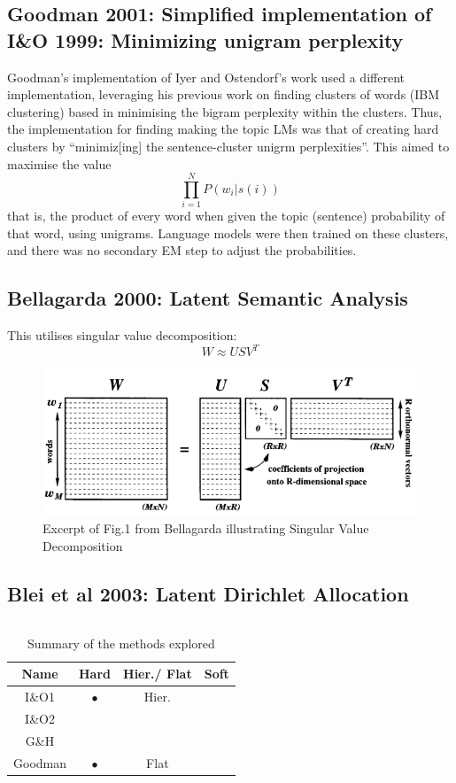 \documentclass{article}
\begin{document}
\subsection{Goodman 2001: Simplified implementation of I\&O 1999: Minimizing unigram perplexity} \label{sec:goodman}
Goodman's implementation of Iyer and Ostendorf's work used a different implementation, leveraging his previous work on finding clusters of words (IBM clustering) based in minimising the bigram perplexity within the clusters. Thus, the implementation for finding making the topic LMs was that of creating hard clusters by ``minimiz[ing] the sentence-cluster unigrm perplexities''. This aimed to maximise the value
$$\prod_{i=1}^{N}P(w_i|s(i))$$
that is, the product of every word when given the topic (sentence) probability of that word, using unigrams. Language models were then trained on these clusters, and there was no secondary EM step to adjust the probabilities.

\FloatBarrier
\subsection{Bellagarda 2000: Latent Semantic Analysis}

This utilises singular value decomposition:
$$W \approx USV^T $$
\begin{figure}
	\caption{Excerpt of Fig.1 from Bellagarda illustrating Singular Value Decomposition}
	\includegraphics[width=\textwidth]{Bellagarda_fig1_cropped}
\end{figure}

\subsection{Blei et al 2003: Latent Dirichlet Allocation}
$$$$


\begin{table}
	\begin{tabular}{|c|c|c|c|} %
	\hline
	Name 		& Hard 	& Hier./ Flat 	& Soft \\
	\hline
	I\&O1 	& $\bullet$  	& Hier.		&\\ 
	I\&O2 	& 		& 			&\\
	G\&H 		& 		& 			&\\
	Goodman	& $\bullet$	& Flat			& \\
	\hline
	\end{tabular}
\caption{Summary of the methods explored}
\end{table}
\end{document}
